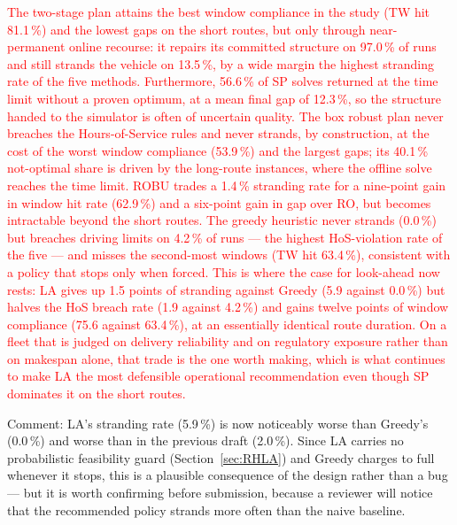 \documentclass[preprint,12pt,3p]{elsarticle}
\newcommand{\red}[1]{\textcolor{red}{#1}}
\newcommand{\green}[1]{{\color{darkgreen}#1}}
\begin{document}
\red{The two-stage plan attains the best window compliance in the study (TW hit
81.1\,\%) and the lowest gaps on the short routes, but only through
near-permanent online recourse: it repairs its committed structure on 97.0\,\%
of runs and still strands the vehicle on 13.5\,\%, by a wide margin the highest
stranding rate of the five methods. Furthermore, 56.6\,\% of SP solves returned
at the time limit without a proven optimum, at a mean final gap of 12.3\,\%, so
the structure handed to the simulator is often of uncertain quality.}
\red{The box robust plan never breaches the Hours-of-Service rules and never
strands, by construction, at the cost of the worst window compliance
(53.9\,\%) and the largest gaps; its 40.1\,\% not-optimal share is driven by the
long-route instances, where the offline solve reaches the time limit.
ROBU trades a 1.4\,\% stranding rate for a nine-point gain in window hit rate
(62.9\,\%) and a six-point gain in gap over RO, but becomes intractable beyond
the short routes.}
\red{The greedy heuristic never strands (0.0\,\%) but breaches driving limits on
4.2\,\% of runs --- the highest HoS-violation rate of the five --- and misses
the second-most windows (TW hit 63.4\,\%), consistent with a policy that stops
only when forced. This is where the case for look-ahead now rests: LA gives up
1.5 points of stranding against Greedy (5.9 against 0.0\,\%) but halves the HoS
breach rate (1.9 against 4.2\,\%) and gains twelve points of window compliance
(75.6 against 63.4\,\%), at an essentially identical route duration. On a fleet
that is judged on delivery reliability and on regulatory exposure rather than on
makespan alone, that trade is the one worth making, which is what continues to
make LA the most defensible operational recommendation even though SP dominates
it on the short routes.}

\green{Comment: LA's stranding rate (5.9\,\%) is now noticeably worse than
Greedy's (0.0\,\%) and worse than in the previous draft (2.0\,\%). Since LA
carries no probabilistic feasibility guard (Section~\ref{sec:RHLA}) and Greedy
charges to full whenever it stops, this is a plausible consequence of the
design rather than a bug --- but it is worth confirming before submission,
because a reviewer will notice that the recommended policy strands more often
than the naive baseline.}
\end{document}
